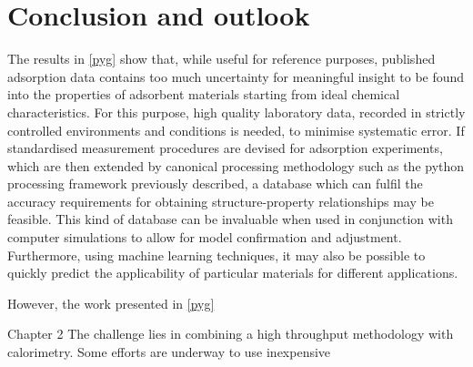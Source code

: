 
\graphicspath{ {\thisch/figures/} }

\chapter*{Conclusion and outlook}\label{conclusion}

The results in \autoref{pyg} show that, while useful for reference
purposes, published adsorption data contains too much
uncertainty for meaningful insight to be found into the properties
of adsorbent materials starting from ideal chemical characteristics.
For this purpose, high quality laboratory data, recorded in strictly 
controlled environments and conditions is needed, to minimise systematic
error. If standardised measurement procedures are devised for adsorption
experiments, which are then extended by canonical processing methodology 
such as the python processing framework previously described, a
database which can fulfil the accuracy requirements for obtaining
structure-property relationships may be feasible. This kind of database
can be invaluable when used in conjunction with computer simulations
to allow for model confirmation and adjustment. Furthermore, using machine
learning techniques, it may also be possible to quickly predict the
applicability of particular materials for different applications.

However, the work presented in \autoref{pyg} 

Chapter 2 
The challenge lies in combining a high throughput methodology with 
calorimetry. Some efforts are underway to use inexpensive

\cite{wollmannInfrasorbOpticalDetection2012}




